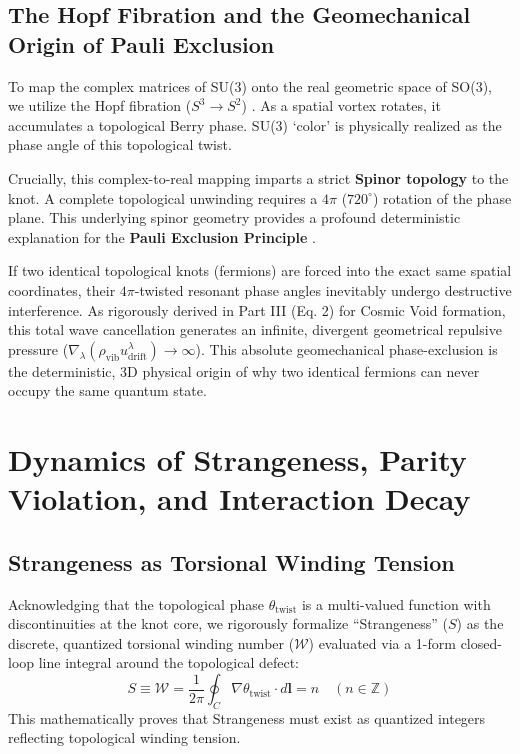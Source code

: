 \documentclass[reprint,amsmath,amssymb,aps,prd]{revtex4-2}
\begin{document}
\subsection{The Hopf Fibration and the Geomechanical Origin of Pauli Exclusion}
To map the complex matrices of SU(3) onto the real geometric space of SO(3), we utilize the Hopf fibration ($S^3 \to S^2$) \cite{Hopf1931}. As a spatial vortex rotates, it accumulates a topological Berry phase. SU(3) `color' is physically realized as the phase angle of this topological twist.

Crucially, this complex-to-real mapping imparts a strict \textbf{Spinor topology} to the knot. A complete topological unwinding requires a $4\pi$ ($720^\circ$) rotation of the phase plane. This underlying spinor geometry provides a profound deterministic explanation for the \textbf{Pauli Exclusion Principle} \cite{Pauli1925}.

If two identical topological knots (fermions) are forced into the exact same spatial coordinates, their $4\pi$-twisted resonant phase angles inevitably undergo destructive interference. As rigorously derived in Part III \cite{YooPart3} (Eq. 2) for Cosmic Void formation, this total wave cancellation generates an infinite, divergent geometrical repulsive pressure ($\nabla_\lambda (\rho_{\mathrm{vib}} u^\lambda_{\mathrm{drift}}) \to \infty$). This absolute geomechanical phase-exclusion is the deterministic, 3D physical origin of why two identical fermions can never occupy the same quantum state.

\section{Dynamics of Strangeness, Parity Violation, and Interaction Decay}

\subsection{Strangeness as Torsional Winding Tension}
Acknowledging that the topological phase $\theta_{\mathrm{twist}}$ is a multi-valued function with discontinuities at the knot core, we rigorously formalize ``Strangeness'' ($S$) as the discrete, quantized torsional winding number ($\mathcal{W}$) evaluated via a 1-form closed-loop line integral around the topological defect:
\begin{equation}
S \equiv \mathcal{W} = \frac{1}{2\pi} \oint_C \nabla \theta_{\mathrm{twist}} \cdot d\mathbf{l} = n \quad (n \in \mathbb{Z})
\end{equation}
This mathematically proves that Strangeness must exist as quantized integers reflecting topological winding tension.
\end{document}
